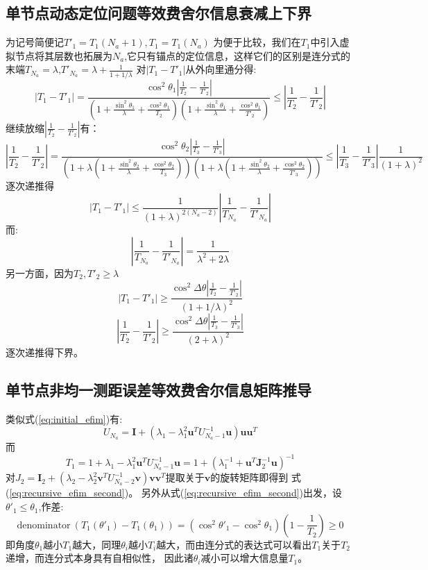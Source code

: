 \subsection{单节点动态定位问题等效费舍尔信息衰减上下界}\label{B_F_2}
为记号简便记$T'_1=T_1(N_a+1),T_1=T_1(N_a)$
为便于比较，我们在$T_1$中引入虚拟节点将其层数也拓展为$N_a$,它只有锚点的定位信息，这样它们的区别是连分式的末端$T_{N_a}=\lambda$,$T'_{N_a}=\lambda+\frac{1}{1+1/\lambda}$
对$|T_1-T'_1|$从外向里通分得:
\[
|T_1-T'_1|=\frac{\cos^2\theta_1|\frac{1}{T_2}-\frac{1}{T'_2}|}{(1+\frac{\sin^2\theta_1}{\lambda}+\frac{\cos^2\theta_1}{T_2})
(1+\frac{\sin^2\theta_1}{\lambda}+\frac{\cos^2\theta_1}{T'_2})}\leq |\frac{1}{T_2}-\frac{1}{T'_2}|
\]
继续放缩$|\frac{1}{T_2}-\frac{1}{T'_2}|$有：
\[
|\frac{1}{T_2}-\frac{1}{T'_2}|= \frac{\cos^2\theta_2|\frac{1}{T_3}-\frac{1}{T'_3}|}{(1+\lambda(1+\frac{\sin^2\theta_2}{\lambda}+\frac{\cos^2\theta_2}{T_3}))
(1+\lambda(1+\frac{\sin^2\theta_2}{\lambda}+\frac{\cos^2\theta_2}{T'_3}))}\leq |\frac{1}{T_3}-\frac{1}{T'_3}|\frac{1}{(1+\lambda)^2}
\]
逐次递推得
\[
|T_1-T'_1|\leq \frac{1}{(1+\lambda)^{2(N_a-2)}} |\frac{1}{T_{N_a}}-\frac{1}{T'_{N_a}}|
\]
而:
\[
|\frac{1}{T_{N_a}}-\frac{1}{T'_{N_a}}|=\frac{1}{\lambda^2+2\lambda}
\]
另一方面，因为$T_2,T'_2\geq \lambda$
\[
|T_1-T'_1|\geq \frac{\cos^2\Delta\theta|\frac{1}{T_2}-\frac{1}{T'_2}|}{(1+1/\lambda)^2}
\]
\[
|\frac{1}{T_2}-\frac{1}{T'_2}|\geq \frac{\cos^2\Delta\theta|\frac{1}{T_3}-\frac{1}{T'_3}|}{(2+\lambda)^2}
\]
逐次递推得下界。
\subsection{单节点非均一测距误差等效费舍尔信息矩阵推导}\label{B_F_3}
类似式(\ref{eq:initial_efim})有:
\[
U_{N_a}=\bm{I}+(\lambda_1-\lambda_1^2 \bm{u}^T U_{N_a-1}^{-1}\bm{u})\bm{u}\bm{u}^T
\]
而
\[
T_1=1+\lambda_1-\lambda_1^2 \bm{u}^T U_{N_a-1}^{-1}\bm{u}=1+(\lambda_1^{-1}+\bm{u}^T\bm{J}_2^{-1}\bm{u})^{-1}
\]
对$J_2=\bm{I}_2+(\lambda_2-\lambda_2^2\bm{v}^T U_{N_a-2}^{-1}\bm{v})\bm{v}\bm{v}^T$提取关于$\bm{v}$的旋转矩阵即得到
式(\ref{eq:recursive_efim_second})。
另外从式(\ref{eq:recursive_efim_second})出发，设$\theta'_1\leq \theta_1$,作差:
\[
\text{denominator}~(T_1(\theta'_1)-T_1(\theta_1))=(\cos^2\theta'_1-\cos^2\theta_1)(1-\frac{1}{T_2})\geq 0
\]
即角度$\theta_1$越小$T_1$越大，同理$\theta_i$越小$T_i$越大，而由连分式的表达式可以看出$T_1$关于$T_2$递增，而连分式本身具有自相似性，
因此诸$\theta_i$减小可以增大信息量$T_1$。

